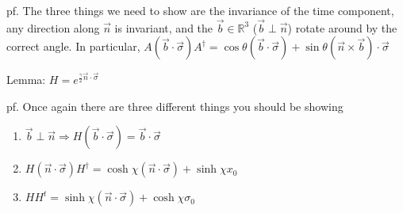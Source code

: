 pf.
The three things we need to show are the invariance of the time component, any direction
along $\vec{n}$ is invariant, and the $\vec{b} \in \mathbb{R}^3$ ($\vec{b} \perp \vec{n}$)
rotate around by the correct angle. In particular,
$A \left(\vec{b} \cdot \vec{\sigma}\right) A^\dagger =
\cos \theta \left(\vec{b} \cdot \vec{\sigma}\right) +
\sin \theta \left(\vec{n}\times\vec{b}\right)\cdot \vec{\sigma}$

Lemma: $H = e^{\frac{\gamma}{2} \vec{n} \cdot \vec{\sigma}}$

pf.
Once again there are three different things you should be showing
\begin{enumerate}
    \item $\vec{b} \perp \vec{n} 
        \Rightarrow H \left(\vec{b}\cdot\vec{\sigma}\right) = \vec{b}\cdot\vec{\sigma}$
    \item $H \left(\vec{n}\cdot\vec{\sigma}\right) H^\dagger =
        \cosh \chi \left(\vec{n}\cdot\vec{\sigma}\right) + \sinh \chi x_0$
    \item $H H^t = \sinh \chi \left(\vec{n}\cdot\vec{\sigma}\right) +
        \cosh \chi \sigma_0$
\end{enumerate}
